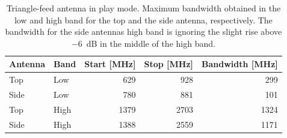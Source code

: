 \begin{table}[htbp]
    \centering
    \begin{tabular}{|l|l|r|r|r|}
        \hline
        Antenna & Band & Start [MHz] & Stop [MHz] & Bandwidth [MHz] \\
        \hline
        Top     & Low  & 629         & 928        & 299  \\
        Side    & Low  & 780         & 881        & 101  \\
        \hline
        Top     & High & 1379        & 2703       & 1324 \\
        Side    & High & 1388        & 2559       & 1171 \\
        \hline
    \end{tabular}
    \caption{Triangle-feed antenna in play mode. Maximum bandwidth obtained in the low and high band for the top and the side antenna, respectively. The bandwidth for the side antennas high band is ignoring the slight rise above \SI{-6}{dB} in the middle of the high band.}
    \label{tab:bw_sol2play}
\end{table}


